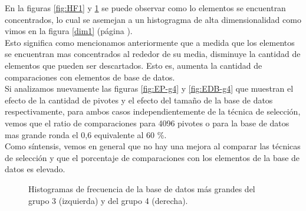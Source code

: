 En la figuras \ref{fig:HF1} y \ref{fig:HF2} se puede observar como lo elementos se encuentran concentrados, lo cual se asemejan a un histogragma de alta dimensionalidad como vimos en la figura \ref{dim1} (p\'agina \pageref{dim1}).\\

Esto significa como mencionamos anteriormente que a medida que los elementos se encuentran mas concentrados al rededor de su media, disminuye la cantidad de elementos que pueden ser descartados. Esto es, aumenta la cantidad de comparaciones con elementos de base de datos.\\

Si analizamos nuevamente las figuras \ref{fig:EP-g4} y \ref{fig:EDB-g4} que muestran el efecto de la cantidad de pivotes y el efecto del tama\~no de la base de datos respectivamente, para ambos casos independientemente de la t\'ecnica de selecci\'on, vemos que el ratio de comparaciones para 4096 pivotes o para la base de datos mas grande ronda el 0,6 equivalente al 60	\%.\\

Como s\'intensis, vemos en general que no hay una mejora al comparar las t\'ecnicas de selecci\'on y que el porcentaje de comparaciones con los elementos de la base de datos es elevado.\\

\begin{figure}[tb]
\centering
{}
		\caption{\small Histogramas de frecuencia de la base de datos m\'as grandes del grupo 1 (izquierda) y del grupo 2 (derecha).}
		\label{fig:HF1}
		
	\caption{\small Histogramas de frecuencia de la base de datos m\'as grandes del grupo 3 (izquierda) y del grupo 4 (derecha).}
		\label{fig:HF2}
\end{figure}
